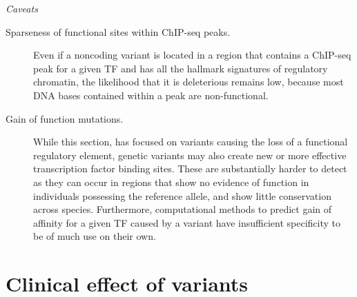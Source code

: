 \textit{Caveats}

	\begin{description}
	
	\item[Sparseness of functional sites within ChIP-seq peaks.] Even if a noncoding variant is located in a region that contains a ChIP-seq peak for a given TF and has all the hallmark signatures of regulatory chromatin, the likelihood that it is deleterious remains low, because most DNA bases contained within a peak are non-functional. 
	
	\item[Gain of function mutations.] While this section, has focused on variants causing the loss of a functional regulatory element, genetic variants may also create new or more effective transcription factor binding sites. These are substantially harder to detect as they can occur in regions that show no evidence of function in individuals possessing the reference allele, and show little conservation across species. Furthermore, computational methods to predict gain of affinity for a given TF caused by a variant have insufficient specificity to be of much use on their own. 
	
	\end{description}

\section{ Clinical effect of variants}

